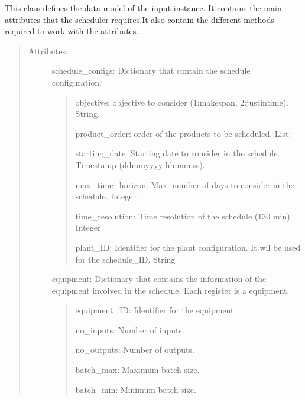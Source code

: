\documentclass[letterpaper,10pt,english]{sphinxmanual}
\begin{document}
\begin{fulllineitems}
\label{\detokenize{index:src.model_data.ModelData}}
\sphinxAtStartPar
{}

\sphinxAtStartPar
This class defines the data model of the input instance. It contains the main attributes that the scheduler
requires.It also contain the different methods required to work with the attributes.
\begin{quote}
\begin{description}
\item[{Attributes:}] \leavevmode
\sphinxAtStartPar
schedule\_configs:     Dictionary that contain the schedule configuration:
\begin{quote}

\sphinxAtStartPar
objective:          objective to consider (1:makespan, 2:just\sphinxhyphen{}in\sphinxhyphen{}time). String.

\sphinxAtStartPar
product\_order:      order of the products to be scheduled. List:

\sphinxAtStartPar
starting\_date:      Starting date to consider in the schedule. Timestamp (dd\sphinxhyphen{}mm\sphinxhyphen{}yyyy hh:mm:ss).

\sphinxAtStartPar
max\_time\_horizon:   Max. number of days to consider in the schedule. Integer.

\sphinxAtStartPar
time\_resolution:    Time resolution of the schedule (1\sphinxhyphen{}30 min). Integer

\sphinxAtStartPar
plant\_ID:    Identifier for the plant configuration. It wil be used for the schedule\_ID. String
\end{quote}

\sphinxAtStartPar
equipment: Dictionary that contains the information of the equipment involved in the schedule.
Each register is a equipment.
\begin{quote}

\sphinxAtStartPar
equipment\_ID: Identifier for the equipment.

\sphinxAtStartPar
no\_inputs:  Number of inputs.

\sphinxAtStartPar
no\_outputs: Number of outputs.

\sphinxAtStartPar
batch\_max: Maximum batch size.

\sphinxAtStartPar
batch\_min: Minimum batch size.


\end{quote}
\end{description}
\end{quote}
\end{fulllineitems}
\end{document}
